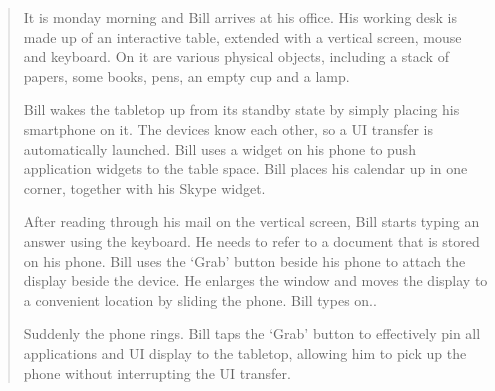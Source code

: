 \begin{quotation}
\small{
It is monday morning and Bill arrives at his office. 
His working desk is made up of an interactive table, extended with a vertical screen, mouse and keyboard. 
On it are various physical objects, including a stack of papers, some books, pens, an empty cup and a lamp.

Bill wakes the tabletop up from its standby state by simply placing his smartphone on it. 
The devices know each other, so a UI transfer is automatically launched. 
Bill uses a widget on his phone to push application widgets to the table space. 
Bill places his calendar up in one corner, together with his Skype widget.

After reading through his mail on the vertical screen, Bill starts typing an answer using the keyboard. 
He needs to refer to a document that is stored on his phone. 
Bill uses the `Grab' button beside his phone to attach the display beside the device. 
He enlarges the window and moves the display to a convenient location by sliding the phone. 
Bill types on..

Suddenly the phone rings. 
Bill taps the `Grab' button to effectively pin all applications and UI display to the tabletop, allowing him to pick up the phone without interrupting the UI transfer.}
\end{quotation}